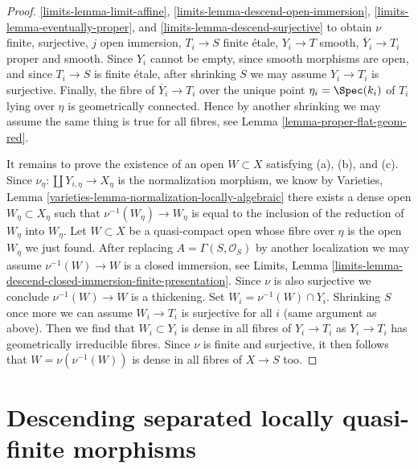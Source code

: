 \begin{proof}
\ref{limits-lemma-limit-affine},
\ref{limits-lemma-descend-open-immersion},
\ref{limits-lemma-eventually-proper}, and
\ref{limits-lemma-descend-surjective}
to obtain $\nu$ finite, surjective, $j$ open immersion, $T_i \to S$ finite
\'etale, $Y_i \to T$ smooth, $\overline{Y}_i \to T_i$ proper and
smooth. Since $Y_i$ cannot be empty, since smooth morphisms
are open, and since $T_i \to S$ is finite \'etale, after shrinking $S$
we may assume $Y_i \to T_i$ is surjective. Finally, the fibre of
$\overline{Y}_i \to T_i$ over the unique point $\eta_i = \Spec(k_i)$ 
of $T_i$ lying over $\eta$ is geometrically connected.
Hence by another shrinking we may assume the same thing is
true for all fibres, see
Lemma \ref{lemma-proper-flat-geom-red}.

\medskip\noindent
It remains to prove the existence of an open $W \subset X$
satisfying (a), (b), and (c). Since $\nu_\eta : \coprod Y_{i, \eta} \to X_\eta$
is the normalization morphism, we know by
Varieties, Lemma \ref{varieties-lemma-normalization-locally-algebraic}
there exists a dense open $W_\eta \subset X_\eta$
such that $\nu^{-1}(W_\eta) \to W_\eta$ is equal to
the inclusion of the reduction of $W_\eta$ into $W_\eta$.
Let $W \subset X$ be a quasi-compact open whose fibre
over $\eta$ is the open $W_\eta$ we just found.
After replacing $A = \Gamma(S, \mathcal{O}_S)$
by another localization we may assume $\nu^{-1}(W) \to W$
is a closed immersion, see Limits, Lemma
\ref{limits-lemma-descend-closed-immersion-finite-presentation}.
Since $\nu$ is also surjective we conclude
$\nu^{-1}(W) \to W$ is a thickening.
Set $W_i = \nu^{-1}(W) \cap Y_i$.
Shrinking $S$ once more we can assume $W_i \to T_i$ is
surjective for all $i$ (same argument as above).
Then we find that $W_i \subset Y_i$
is dense in all fibres of $Y_i \to T_i$ as $Y_i \to T_i$ has
geometrically irreducible fibres.
Since $\nu$ is finite and surjective, it then follows
that $W = \nu(\nu^{-1}(W))$ is dense in all fibres
of $X \to S$ too.
\end{proof}













\section{Descending separated locally quasi-finite morphisms}
\label{section-separated-locally-quasi-finite}

